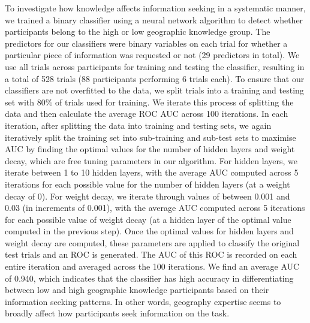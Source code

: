 \documentclass[a4paper, nobind]{templates/ociamthesis}
\begin{document}
To investigate how knowledge affects information seeking in a systematic manner, we trained a binary classifier using a neural network algorithm to detect whether participants belong to the high or low geographic knowledge group. The predictors for our classifiers were binary variables on each trial for whether a particular piece of information was requested or not (29 predictors in total). We use all trials across participants for training and testing the classifier, resulting in a total of 528 trials (88 participants performing 6 trials each). To ensure that our classifiers are not overfitted to the data, we split trials into a training and testing set with 80\% of trials used for training. We iterate this process of splitting the data and then calculate the average ROC AUC across 100 iterations. In each iteration, after splitting the data into training and testing sets, we again iteratively split the training set into sub-training and sub-test sets to maximise AUC by finding the optimal values for the number of hidden layers and weight decay, which are free tuning parameters in our algorithm. For hidden layers, we iterate between 1 to 10 hidden layers, with the average AUC computed across 5 iterations for each possible value for the number of hidden layers (at a weight decay of 0). For weight decay, we iterate through values of between 0.001 and 0.03 (in increments of 0.001), with the average AUC computed across 5 iterations for each possible value of weight decay (at a hidden layer of the optimal value computed in the previous step). Once the optimal values for hidden layers and weight decay are computed, these parameters are applied to classify the original test trials and an ROC is generated. The AUC of this ROC is recorded on each entire iteration and averaged across the 100 iterations. We find an average AUC of 0.940, which indicates that the classifier has high accuracy in differentiating between low and high geographic knowledge participants based on their information seeking patterns. In other words, geography expertise seems to broadly affect how participants seek information on the task.
\end{document}

